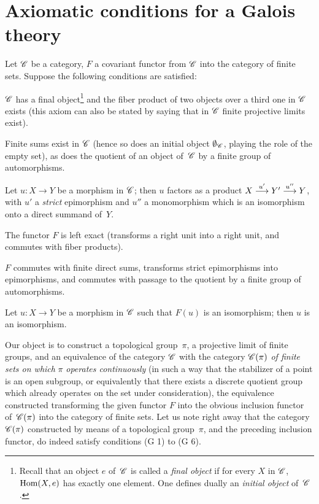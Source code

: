 \section{Axiomatic conditions for a Galois theory}
\label{V.4}
Let $\cal{C}$ be a category, $F$ a covariant functor from
$\cal{C}$ into the category of finite sets. Suppose the
following conditions are satisfied:

\begin{enumerateb}

\item[(G 1)] $\cal{C}$ has a final object\footnote{Recall that an object
$e$ of~$\cal{C}$ is called a \emph{final object} if for every $X$ in
$\cal{C}$, $\operatorname{Hom}(X,e)$ has exactly one element. One defines
dually an \emph{initial object} of~$\cal{C}$.} and the fiber
product of two objects over a third one in $\cal{C}$
exists (this axiom can also be stated by saying that in
$\cal{C}$ finite projective limits exist).

\item[(G 2)] Finite sums exist in $\cal{C}$ (hence so does an
initial object $\emptyset_{\cal{C}}$, playing the role of the empty
set), as does the quotient of an object of~$\cal{C}$ by a finite
group of automorphisms.

\item[(G 3)] Let $u \colon X \to Y$ be a morphism in $\cal{C}$;
then $u$ factors as a product $X\lto{u'} Y'\lto{u''} Y$, with $u'$ a \emph{strict} epimorphism and
$u''$ a monomorphism which is an isomorphism onto a direct summand
of~$Y$.

\item[(G 4)]
The functor $F$ is left exact (\ie transforms a right unit
into a right unit, and commutes with fiber
products).

\item[(G 5)] $F$ commutes with finite direct sums, transforms
strict epimorphisms into epimorphisms, and commutes with
passage to the quotient by a finite group of automorphisms.

\item[(G 6)] Let $u \colon X \to Y$ be a morphism in $\cal{C}$ such
that $F(u)$ is an isomorphism; then $u$ is an isomorphism.
\end{enumerateb}

Our object is to construct a topological group~$\pi$, a projective
limit of finite groups, and an equivalence of the
category $\cal{C}$ with the category $\cal{C}(\pi)$
\emph{of finite sets on which} $\pi$ \emph{operates
continuously} (\ie in such a way that the stabilizer of a
point is an open subgroup, or equivalently that there exists a discrete
quotient group which already operates on the set
under consideration), the equivalence constructed transforming the given
functor $F$ into the obvious inclusion functor of~$\cal{C}(\pi)$
into the category of finite sets. Let us note right away that
the category $\cal{C}(\pi)$ constructed by means of a topological
group~$\pi$, and the preceding inclusion functor,
do indeed satisfy conditions (G 1) to (G 6).

